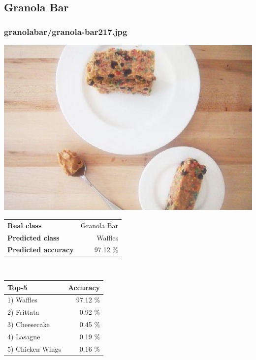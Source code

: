 \subsection{Granola Bar}
    
\subsubsection{granola\textunderscore bar/granola-bar217.jpg}

\begin{minipage}[t]{0.4\textwidth}
	\vspace{0pt}
	\includegraphics[width=\linewidth]{images/evaluation-images/granola_bar/granola-bar217.jpg}
\end{minipage}
\hfill
\begin{minipage}[t]{0.5\textwidth}
	\vspace{0pt}\raggedright
	\begin{tabularx}{\textwidth}{X r}
		\small \textbf{Real class} & \small Granola Bar\\
		\small \textbf{Predicted class} & \small Waffles\\
		\small \textbf{Predicted accuracy} & \small 97.12 \%
    \end{tabularx}\\
    
    \vspace{6pt}
	\begin{tabularx}{\textwidth}{X r}
        \small \textbf{Top-5} & \small \textbf{Accuracy} \\
        \hline
		\small 1) Waffles & \small 97.12 \%\\\small 2) Frittata & \small 0.92 \%\\\small 3) Cheesecake & \small 0.45 \%\\\small 4) Lasagne & \small 0.19 \%\\\small 5) Chicken Wings & \small 0.16 \%
    \end{tabularx}
\end{minipage}
    
